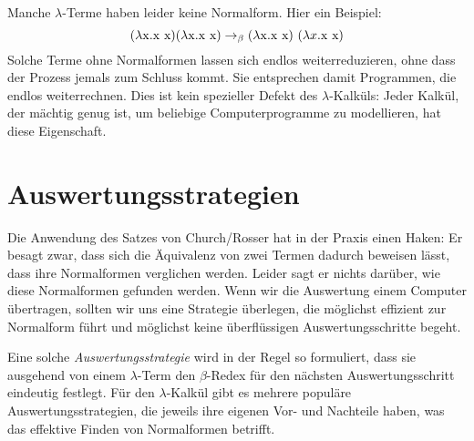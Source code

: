 Manche
$\lambda$-Terme haben leider keine Normalform.  Hier ein
Beispiel:
%
\begin{displaymath}
  (\lambda \mathrm x.\mathrm x~\mathrm x)(\lambda \mathrm x.\mathrm x~\mathrm x) \rightarrow_\beta (\lambda \mathrm x.\mathrm x~\mathrm x)~(\lambda x.\mathrm x~\mathrm x)
\end{displaymath}
%
Solche Terme ohne Normalformen lassen sich endlos weiterreduzieren,
ohne dass der Prozess jemals zum Schluss kommt.  Sie entsprechen damit
Programmen, die endlos weiterrechnen.
Dies ist kein spezieller Defekt des
$\lambda$-Kalküls: Jeder Kalkül, der mächtig genug ist, um beliebige
Computerprogramme zu modellieren, hat diese Eigenschaft.

\section{Auswertungsstrategien}
\label{sec:lambda-evaluation-strategies}

Die Anwendung des Satzes von
Church/Rosser hat in der Praxis einen Haken: Er besagt zwar, dass sich
die Äquivalenz von zwei Termen dadurch beweisen lässt, dass ihre
Normalformen verglichen werden.  Leider sagt er nichts darüber,
wie diese Normalformen gefunden werden.  Wenn wir die Auswertung einem
Computer übertragen, sollten wir uns eine Strategie überlegen, die
möglichst effizient zur Normalform führt und möglichst keine
überflüssigen Auswertungsschritte begeht.

Eine solche \textit{Auswertungsstrategie} wird in der Regel so
formuliert, dass sie ausgehend von einem $\lambda$-Term den 
$\beta$-Redex für den nächsten Auswertungsschritt eindeutig festlegt.
Für den $\lambda$-Kalkül gibt es mehrere
populäre Auswertungsstrategien, die jeweils ihre eigenen Vor- und
Nachteile haben, was das effektive Finden von Normalformen betrifft.

